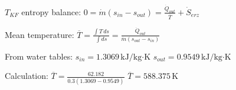 \( T_{KF} \) entropy balance:  
\( 0 = \dot{m} (s_{in} - s_{out}) = \frac{\dot{Q}_{out}}{\overline{T}} + \dot{S}_{erz} \)  

Mean temperature:  
\( \overline{T} = \frac{\int T \, ds}{\int ds} = \frac{\dot{Q}_{out}}{\dot{m} (s_{out} - s_{in})} \)  

From water tables:  
\( s_{in} = 1.3069 \, \text{kJ/kg·K} \)  
\( s_{out} = 0.9549 \, \text{kJ/kg·K} \)  

Calculation:  
\( \overline{T} = \frac{62.182}{0.3 (1.3069 - 0.9549)} \)  
\( \overline{T} = 588.375 \, \text{K} \)